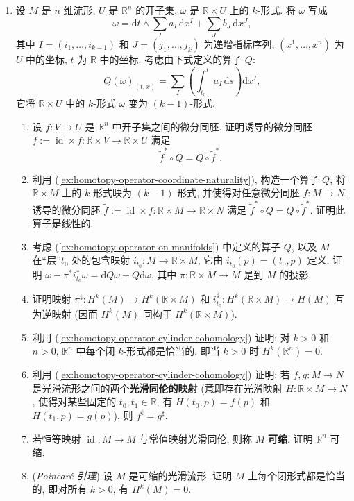 \begin{RiemannExercise}
\begin{enumerate}[label=(\arabic*),ref=\arabic*,leftmargin=*]
\item\label{ex:homotopy-operator-and-poincare-lemma} 设 $M$ 是 $n$ 维流形, $U$ 是 $\mathbb{R}^n$ 的开子集, $\omega$ 是 $\mathbb{R}\times U$ 上的 $k$-形式. 将 $\omega$ 写成
\[
  \omega=\mathrm{d}t\wedge\sum_Ia_I\,\mathrm{d}x^I+\sum_Jb_J\,\mathrm{d}x^J,
\]
其中 $I=(i_1,\ldots,i_{k-1})$ 和 $J=(j_1,\ldots,j_k)$ 为递增指标序列, $(x^1,\ldots,x^n)$ 为 $U$ 中的坐标, $t$ 为 $\mathbb{R}$ 中的坐标. 考虑由下式定义的算子 $Q$:
\[
  Q(\omega)_{(t,x)}=\sum_I\left(\int_{t_0}^ta_I\,\mathrm{d}s\right)\mathrm{d}x^I,
\]
它将 $\mathbb{R}\times U$ 中的 $k$-形式 $\omega$ 变为 $(k-1)$-形式.
\begin{enumerate}[label=(\alph*),ref=\alph*,leftmargin=*]
\item\label{ex:homotopy-operator-coordinate-naturality} 设 $f:V\to U$ 是 $\mathbb{R}^n$ 中开子集之间的微分同胚. 证明诱导的微分同胚 $\widetilde f:=\operatorname{id}\times f:\mathbb{R}\times V\to\mathbb{R}\times U$ 满足
\[
  \widetilde f^*\circ Q=Q\circ\widetilde f^*.
\]
\item\label{ex:homotopy-operator-on-manifolds} 利用 (\ref{ex:homotopy-operator-coordinate-naturality}), 构造一个算子 $Q$, 将 $\mathbb{R}\times M$ 上的 $k$-形式映为 $(k-1)$-形式, 并使得对任意微分同胚 $f:M\to N$, 诱导的微分同胚 $\widetilde f:=\operatorname{id}\times f:\mathbb{R}\times M\to\mathbb{R}\times N$ 满足 $\widetilde f^*\circ Q=Q\circ\widetilde f^*$. 证明此算子是线性的.
\item 考虑 (\ref{ex:homotopy-operator-on-manifolds}) 中定义的算子 $Q$, 以及 $M$ 在\textquotedblleft 层\textquotedblright $t_0$ 处的包含映射 $i_{t_0}:M\to\mathbb{R}\times M$, 它由 $i_{t_0}(p)=(t_0,p)$ 定义. 证明 $\omega-\pi^*i_{t_0}^*\omega=\mathrm{d}Q\omega+Q\mathrm{d}\omega$, 其中 $\pi:\mathbb{R}\times M\to M$ 是到 $M$ 的投影.
\item\label{ex:homotopy-operator-cylinder-cohomology} 证明映射 $\pi^\sharp:H^k(M)\to H^k(\mathbb{R}\times M)$ 和 $i_{t_0}^\sharp:H^k(\mathbb{R}\times M)\to H(M)$ 互为逆映射 (因而 $H^k(M)$ 同构于 $H^k(\mathbb{R}\times M)$).
\item 利用 (\ref{ex:homotopy-operator-cylinder-cohomology}) 证明: 对 $k>0$ 和 $n>0$, $\mathbb{R}^n$ 中每个闭 $k$-形式都是恰当的, 即当 $k>0$ 时 $H^k(\mathbb{R}^n)=0$.
\item 利用 (\ref{ex:homotopy-operator-cylinder-cohomology}) 证明: 若 $f,g:M\to N$ 是光滑流形之间的两个\textbf{光滑同伦的映射} (意即存在光滑映射 $H:\mathbb{R}\times M\to N$, 使得对某些固定的 $t_0,t_1\in\mathbb{R}$, 有 $H(t_0,p)=f(p)$ 和 $H(t_1,p)=g(p)$), 则 $f^\sharp=g^\sharp$.
\item 若恒等映射 $\operatorname{id}:M\to M$ 与常值映射光滑同伦, 则称 $M$ \textbf{可缩}. 证明 $\mathbb{R}^n$ 可缩.
\item (\emph{Poincaré 引理}) 设 $M$ 是可缩的光滑流形. 证明 $M$ 上每个闭形式都是恰当的, 即对所有 $k>0$, 有 $H^k(M)=0$.


\end{enumerate}
\end{enumerate}
\end{RiemannExercise}
